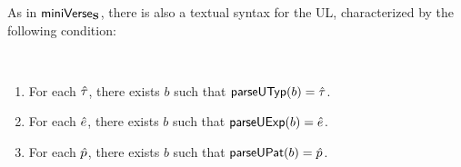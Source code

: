 As in $\mathsf{miniVerse}_\textbf{S}$, there is also a textual syntax for the UL, characterized by the following condition:
\begingroup
\def\thetheorem{\ref{condition:textual-representability-BS}}
\begin{condition} ~
\begin{enumerate}
\item For each ${\hat\tau}$, there exists $b$ such that $\mathsf{parseUTyp}(b)={\hat\tau}$. 
\item For each ${\hat e}$, there exists $b$ such that $\mathsf{parseUExp}(b)={\hat e}$.
\item {For each $\hat{p}$, there exists $b$ such that $\mathsf{parseUPat}(b)=\hat{p}$.}
\end{enumerate}
\end{condition}
\endgroup

